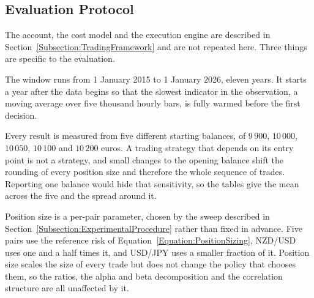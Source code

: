 \subsection{Evaluation Protocol}
\label{Subsection:EvaluationProtocol}

The account, the cost model and the execution engine are described in Section~\ref{Subsection:TradingFramework} and are not repeated here. Three things are specific to the evaluation.

The window runs from 1 January 2015 to 1 January 2026, eleven years. It starts a year after the data begins so that the slowest indicator in the observation, a moving average over five thousand hourly bars, is fully warmed before the first decision.

Every result is measured from five different starting balances, of $9\,900$, $10\,000$, $10\,050$, $10\,100$ and $10\,200$ euros. A trading strategy that depends on its entry point is not a strategy, and small changes to the opening balance shift the rounding of every position size and therefore the whole sequence of trades. Reporting one balance would hide that sensitivity, so the tables give the mean across the five and the spread around it.

Position size is a per-pair parameter, chosen by the sweep described in Section~\ref{Subsection:ExperimentalProcedure} rather than fixed in advance. Five pairs use the reference risk of Equation~\ref{Equation:PositionSizing}, NZD/USD uses one and a half times it, and USD/JPY uses a smaller fraction of it. Position size scales the size of every trade but does not change the policy that chooses them, so the ratios, the alpha and beta decomposition and the correlation structure are all unaffected by it.